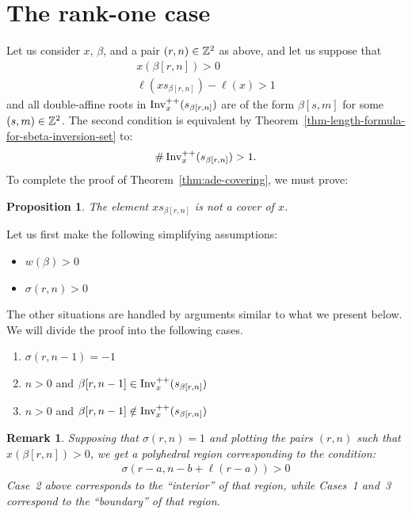 \documentclass[10pt]{amsart}
\newtheorem{prop}[theo]{Proposition}
\newtheorem{rema}[theo]{Remark}
\begin{document}
\section{The rank-one case}

Let us consider $x$, $\beta$, and a pair $(r,n) \in \mathbb{Z}^2$ as above, and let us suppose that
\begin{align}\label{eq:104}
x(\beta[r,n]) > 0 \\
\ell(xs_{\beta[r,n]}) - \ell(x) > 1
\end{align}
and all double-affine roots in $\operatorname{Inv}^{++}_x(s_{\beta[r,n]})$ are of the form $\beta[s,m]$ for some $(s,m) \in \mathbb{Z}^2$. The second condition is equivalent by Theorem~\ref{thm-length-formula-for-sbeta-inversion-set} to:
\begin{equation}\label{eq:105}
\#\Invplusplusx(s_{\beta[r,n]}) > 1.
\end{equation}
To complete the proof of Theorem~\ref{thm:ade-covering}, we must prove:

\begin{prop}\label{prop:sl-two-cover-classification}
The element $xs_{\beta[r,n]}$ is \emph{not} a cover of $x$.
\end{prop}

Let us first make the following simplifying assumptions:
\begin{itemize}
\item $w(\beta) > 0$
\item $\sigma(r,n) > 0$
\end{itemize}
The other situations are handled by arguments similar to what we present below. We will divide the proof into the following cases.
\begin{enumerate}[label=Case \arabic*:]
\item $\sigma(r,n-1) = -1$
\item $n > 0$ and $ \beta[r,n-1] \in \operatorname{Inv}^{++}_x(s_{\beta[r,n]})$
\item $n > 0$ and $ \beta[r,n-1] \notin \operatorname{Inv}^{++}_x(s_{\beta[r,n]})$
\end{enumerate}

\begin{rema}
Supposing that $\sigma(r,n) =1$ and plotting the pairs $(r,n)$ such that $x(\beta[r,n]) > 0$, we get a polyhedral region corresponding to the condition:
\begin{align}\label{eq:48}
\sigma(r-a,n-b+\ell(r-a)) > 0
\end{align}
Case~2 above corresponds to the ``interior'' of that region, while Cases~1 and~3 correspond to the ``boundary'' of that region.
\end{rema}
\end{document}
